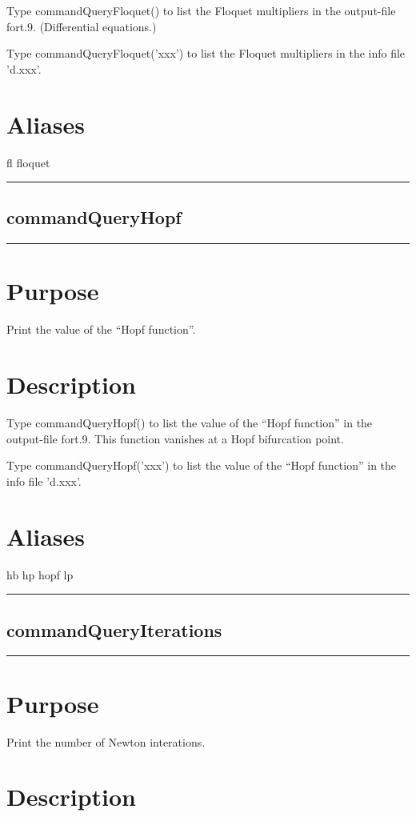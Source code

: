 \documentclass[12pt]{report}
\begin{document}
\begin{minipage}{6in}
    Type commandQueryFloquet() to list the Floquet multipliers
    in the output-file fort.9. 
    (Differential equations.)

    Type commandQueryFloquet('xxx') to list the Floquet multipliers 
    in the info file 'd.xxx'.
    \section*{Aliases}
fl floquet \medskip\hrule\end{minipage}\subsection{commandQueryHopf} \label{sec:clui_ref_commandQueryHopf}\begin{minipage}{6in}\hrule\medskip\section*{Purpose}
Print the value of the ``Hopf function''.\section*{Description}

    Type commandQueryHopf() to list the value of the ``Hopf function'' 
    in the output-file fort.9. This function
    vanishes at a Hopf bifurcation point.

    Type commandQueryHopf('xxx') to list the value of the ``Hopf function''
    in the info file 'd.xxx'.
    \section*{Aliases}
hb hp hopf lp \medskip\hrule\end{minipage}\subsection{commandQueryIterations} \label{sec:clui_ref_commandQueryIterations}\begin{minipage}{6in}\hrule\medskip\section*{Purpose}
Print the number of Newton interations.\section*{Description}


\end{minipage}
\end{document}
